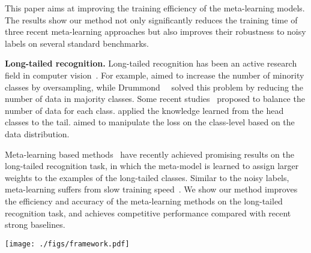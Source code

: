 \documentclass[final]{cvpr}
\newcommand{\methodname}{Faster Meta Update Strategy}
\begin{document}
This paper aims at improving the training efficiency of the meta-learning models. The results show our method not only significantly reduces the training time of three recent meta-learning approaches but also improves their robustness to noisy labels on several standard benchmarks.


\noindent\textbf{Long-tailed recognition.} Long-tailed recognition has been an active research field in computer vision~\cite{chawla2002smote, drummond2003c4, han2005borderline, shen2016relay, mahajan2018exploring, yin2019feature, liu2019large, khan2017cost, cui2019class, cao2019learning, Jamal_2020_CVPR, zhou2020bbn,zhu2020inflated}. 
For example, \cite{chawla2002smote, han2005borderline} aimed to increase the number of minority classes by oversampling, while Drummond~\etal~\cite{drummond2003c4} solved this problem by reducing the number of data in majority classes. Some recent studies~\cite{shen2016relay, mahajan2018exploring} proposed to balance the number of data for each class. \cite{yin2019feature, liu2019large} applied the knowledge learned from the head classes to the tail. 
\cite{khan2017cost, cui2019class, cao2019learning, zhou2020bbn} aimed to manipulate the loss on the class-level based on the data distribution. 

Meta-learning based methods~\cite{ren2018learning, shu2019meta, Jamal_2020_CVPR} have recently achieved promising results on the long-tailed recognition task, in which the meta-model is learned to assign larger weights to the examples of the long-tailed classes. Similar to the noisy labels, meta-learning suffers from slow training speed~\cite{ren2018learning, shu2019meta, wang2020training, Jamal_2020_CVPR}. We show our method improves the efficiency and accuracy of the meta-learning methods on the long-tailed recognition task, and achieves competitive performance compared with recent strong baselines.

 

\begin{figure*}[t]
\centering
\texttt{[image: ./figs/framework.pdf]}
\caption{Illustration of the proposed method. We propose a new Meta-Train step, named \methodname\space (\ie, the red line \textcircled{4}), which learns a gradient sampler (denoted as ) to aggregate the meta gradient for each layer. In this figure, the meta gradients from the -th and -th layers would be aggregated to compute  and used to update the meta-model .}
\vspace{-2mm}
\label{fig:framework}
\end{figure*}
\end{document}
